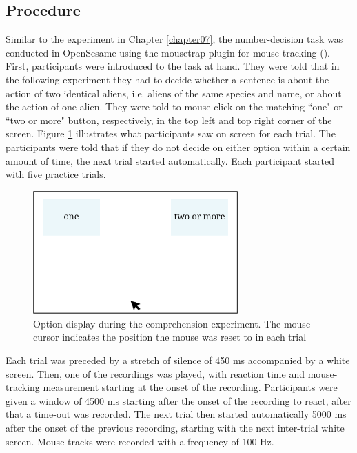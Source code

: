 \subsection{Procedure}\label{section08_1_3}

Similar to the experiment in Chapter \ref{chapter07}, the number-decision task was conducted in OpenSesame using the mousetrap plugin for mouse-tracking (\cite{Kieslich2017}). First, participants were introduced to the task at hand. They were told that in the following experiment they had to decide whether a sentence is about the action of two identical aliens, i.e. aliens of the same species and name, or about the action of one alien. They were told to mouse-click on the matching ``one" or ``two or more" button, respectively, in the top left and top right corner of the screen. Figure \ref{fig:8_1} illustrates what participants saw on screen for each trial. The participants were told that if they do not decide on either option within a certain amount of time, the next trial started automatically. Each participant started with five practice trials.

\begin{figure}
    \centering
    \includegraphics[width=0.7\textwidth]{figures/fig8.1.png}
    \caption{Option display during the comprehension experiment. The mouse cursor indicates the position the mouse was reset to in each trial}
    \label{fig:8_1}
\end{figure}

Each trial was preceded by a stretch of silence of 450 ms accompanied by a white screen. Then, one of the recordings was played, with reaction time and mouse-tracking measurement starting at the onset of the recording. Participants were given a window of 4500 ms starting after the onset of the recording to react, after that a time-out was recorded. The next trial then started automatically 5000 ms after the onset of the previous recording, starting with the next inter-trial white screen. Mouse-tracks were recorded with a frequency of 100 Hz.

